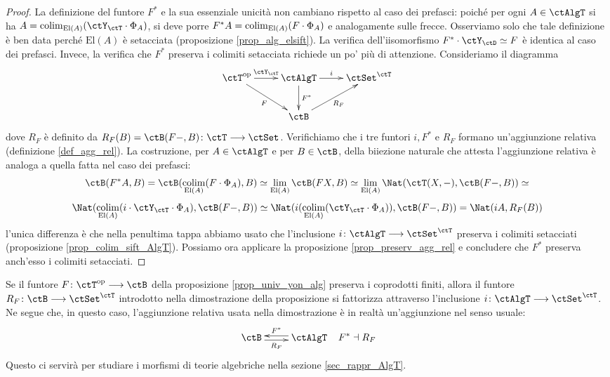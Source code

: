 \begin{proof}
 La definizione del funtore \(F^*\) e la sua essenziale unicità non cambiano rispetto al caso dei prefasci: poiché per ogni \(A \in \ctAlgT\)
 si ha \(A = \colim_{\mathrm{El}(A)}(\ctY_{\ctT} \cmp \Phi_A)\), si deve porre \(F^*A = \operatorname*{colim}_{\mathrm{El}(A)}(F \cdot \Phi_A)\)
 e analogamente sulle frecce. Osserviamo solo che tale definizione è ben data perché \(\mathrm{El}(A)\) è setacciata
 (proposizione \ref{prop_alg_elsift}). La verifica dell'iisomorfismo \(F^* \cmp \ctY_{\ctD} \simeq F\) è identica al caso dei prefasci.
 Invece, la verifica che \(F^*\) preserva i colimiti setacciata richiede un po' più di attenzione. Consideriamo il diagramma
 \[\xymatrix{\ctT^{\op} \ar[rd]_{F} \ar[r]^-{\ctY_{\ctT}} & \ctAlgT \ar[r]^-{i} \ar[d]^{F^*} & \ctSet^{\ctT} \\
  & \ctB \ar[ru]_{R_F} }\]
 dove \(R_F\) è definito da \(R_F(B) = \ctB(F-,B) \colon \ctT \fun \ctSet\). Verifichiamo che i tre funtori \(i, F^*\) e \(R_F\)
 formano un'aggiunzione relativa (definizione \ref{def_agg_rel}). La costruzione, per \(A \in \ctAlgT\) e per \(B \in \ctB\), della
 biiezione naturale che attesta l'aggiunzione relativa è analoga a quella fatta nel caso dei prefasci:
 \[ \ctB(F^*A,B) = \ctB(\colim_{\mathrm{El}(A)}(F \cmp \Phi_A),B) \simeq \lim_{\mathrm{El}(A)}\ctB(FX,B)
  \simeq \lim_{\mathrm{El}(A)} \Nat(\ctT(X,-), \ctB(F-,B)) \simeq \]
 \[ \Nat(\colim_{\mathrm{El}(A)}(i \cmp \ctY_{\ctT} \cmp \Phi_A), \ctB(F-,B)) \simeq
  \Nat(i(\colim_{\mathrm{El}(A)}(\ctY_{\ctT} \cmp \Phi_A)), \ctB(F-,B))
  = \Nat(iA,R_F(B)) \]
 l'unica differenza è che nella penultima tappa abbiamo usato che l'inclusione \(i \colon \ctAlgT \fun \ctSet^{\ctT}\) preserva
 i colimiti setacciati (proposizione \ref{prop_colim_sift_AlgT}). Possiamo ora applicare la proposizione \ref{prop_preserv_agg_rel}
 e concludere che \(F^*\) preserva anch'esso i colimiti setacciati.
\end{proof}

\begin{remark}\label{oss_aggrel_alg}
 Se il funtore \(F \colon \ctT^{\op} \fun \ctB\) della proposizione \ref{prop_univ_yon_alg} preserva i coprodotti finiti,
 allora il funtore \(R_F \colon \ctB \fun \ctSet^{\ctT}\) introdotto nella dimostrazione della proposizione si fattorizza
 attraverso l'inclusione \(i \colon \ctAlgT \fun \ctSet^{\ctT}\). Ne segue che, in questo caso, l'aggiunzione relativa
 usata nella dimostrazione è in realtà un'aggiunzione nel senso usuale:
 \[ \xymatrix{\ctB \ar@<-0.5ex>[r]_-{R_F} & \ctAlgT \ar@<-0.5ex>[l]_-{F^*} } \;\;\; F^* \dashv R_F \]
 Questo ci servirà per studiare i morfismi di teorie algebriche nella sezione \ref{sec_rappr_AlgT}.
\end{remark}

